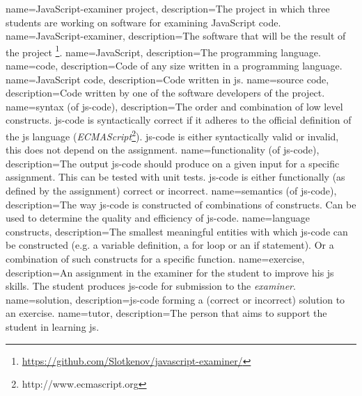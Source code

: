 {
  name=JavaScript-examiner project,
  description={The project in which three students are working
    on software for examining JavaScript code.}
}
{
  name=JavaScript-examiner,
  description={The software that will be the result of the \gls{project}
    \footnote{\url{https://github.com/Slotkenov/javascript-examiner/}}.}
}
{
  name=JavaScript,
  description={The programming language.}
}
{
  name=code,
  description={Code of any size written in a programming language.}
}
{
  name=JavaScript code,
  description={Code written in \gls{js}.}
}
{
  name=source code,
  description={Code written by one of the software developers
    of the \gls{project}.}
}
{
  name=syntax (of \gls{js-code}),
  description={The order and combination of low level \gls{constructs}.
    \gls{js-code} is syntactically correct if it adheres
    to the official definition of the \gls{js} language
    ({\em ECMAScript}\footnote{http://www.ecmascript.org}).
    \gls{js-code} is either syntactically valid or invalid,
    this does not depend on the assignment.}
}
{
  name=functionality (of \gls{js-code}),
  description={The output \gls{js-code} should produce
    on a given input for a specific assignment.
    This can be tested with unit tests.
    \Gls{js-code} is either functionally (as defined by the assignment)
    correct or incorrect.}
}
{
  name=semantics (of \gls{js-code}),
  description={The way \gls{js-code} is constructed
    of combinations of \gls{constructs}.
    Can be used to determine the quality and efficiency of \gls{js-code}.}
}
{
  name=language constructs,
  description={The smallest meaningful entities
    with which \gls{js-code} can be constructed
    (e.g. a variable definition, a for loop or an if statement).
    Or a combination of such constructs for a specific function.}
}
{
  name=exercise,
  description={An assignment in the \gls{examiner} for the \gls{student}
    to improve his \gls{js} skills.
    The student produces \gls{js-code} for submission to the {\em examiner}.}
}
{
  name=solution,
  description={\Gls{js-code} forming a
    (correct or incorrect) solution to an exercise.}
}
{
  name=tutor,
  description={The person that aims to support the \gls{student}
    in learning \gls{js}.}
}
